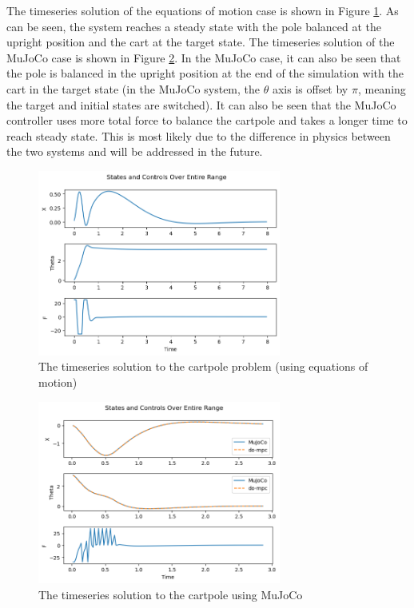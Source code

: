 \documentclass{./springer/svjour3}
\begin{document}
The timeseries solution of the equations of motion case is shown in Figure \ref{fig:sol_eqn}. As can be seen, the system reaches a steady state with the pole balanced 
at the upright position and the cart at the target state. The timeseries solution of the MuJoCo case is shown in Figure \ref{fig:sol_mj}. In the MuJoCo case, it can 
also be seen that the pole is balanced in the upright position at the end of the simulation with the cart in the target state (in the MuJoCo system, the 
$\theta$ axis is offset by $\pi$, meaning the target and initial states are switched). It can also be seen that the MuJoCo controller uses more total force to 
balance the cartpole and takes a longer time to reach steady state. This is most likely due to the difference in physics between the two systems and will be addressed in the future.

\begin{figure}[!h]
  \centering
  \includegraphics[width=8cm]{./figures/timeseries_dynamics.png} %
  \caption{The timeseries solution to the cartpole problem (using equations of motion)}
  \label{fig:sol_eqn}
\end{figure}

\begin{figure}[!h]
  \centering
  \includegraphics[width=8cm]{./figures/cartpole_mj_timeseries_normlen.png} %
  \caption{The timeseries solution to the cartpole using MuJoCo}
  \label{fig:sol_mj}
\end{figure}
\end{document}
